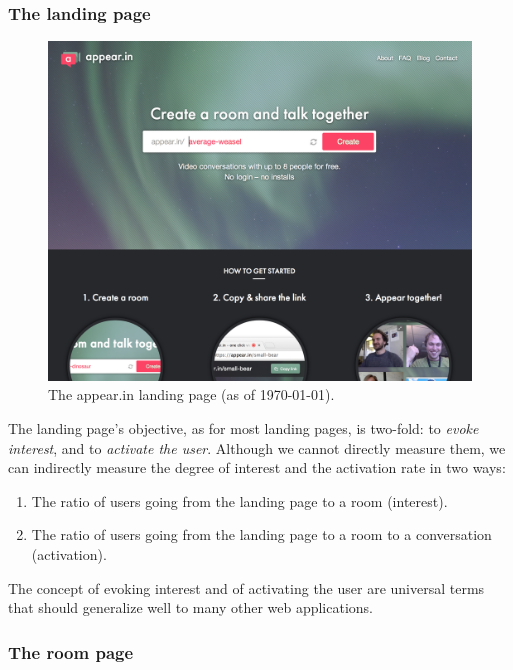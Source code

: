     \subsubsection{The landing page}

    \begin{figure}[h]
      \centering
        \includegraphics[width=\textwidth]{Figures/screenshots/appearin/frontpage-v2}
        \caption{The appear.in landing page (as of \today).}
        \label{fig:appearin_landing}
    \end{figure}

    The landing page's objective, as for most landing pages, is two-fold: to \emph{evoke interest}, and to \emph{activate the user}. Although we cannot directly measure them, we can indirectly measure the degree of interest and the activation rate in two ways:

    \begin{enumerate}
      \item The ratio of users going from the landing page to a room (interest).
      \item The ratio of users going from the landing page to a room to a conversation (activation).
    \end{enumerate}

    The concept of evoking interest and of activating the user are universal terms that should generalize well to many other web applications.

    \subsubsection{The room page}

